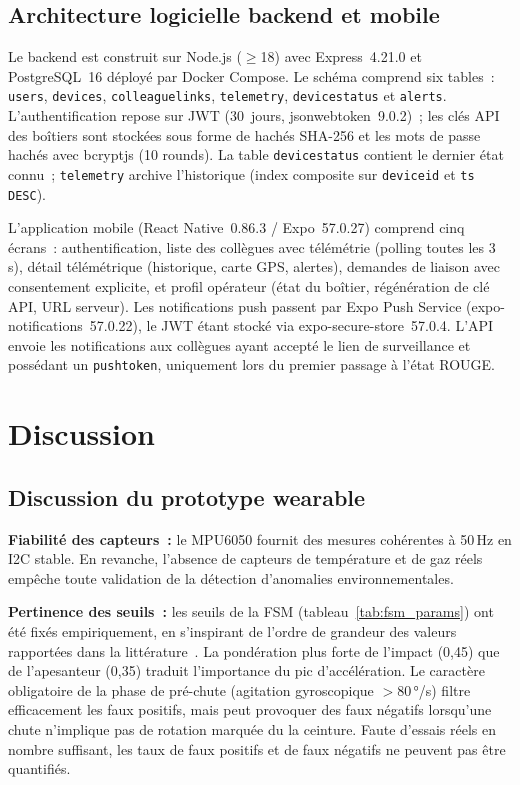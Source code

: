 \documentclass[12pt,a4paper]{article}
\renewcommand{\_}{\textunderscore\allowbreak}
\begin{document}
\subsection{Architecture logicielle backend et mobile}

Le backend est construit sur Node.js ($\geq$18) avec Express~4.21.0 et PostgreSQL~16 déployé par Docker Compose. Le schéma comprend six tables~: \texttt{users}, \texttt{devices}, \texttt{colleague\_links}, \texttt{telemetry}, \texttt{device\_status} et \texttt{alerts}. L'authentification repose sur JWT (30~jours, jsonwebtoken~9.0.2)~; les clés API des boîtiers sont stockées sous forme de hachés SHA-256 et les mots de passe hachés avec bcryptjs (10 rounds). La table \texttt{device\_status} contient le dernier état connu~; \texttt{telemetry} archive l'historique (index composite sur \texttt{device\_id} et \texttt{ts DESC}).

L'application mobile (React Native~0.86.3 / Expo~57.0.27) comprend cinq écrans~: authentification, liste des collègues avec télémétrie (polling toutes les 3\,s), détail télémétrique (historique, carte GPS, alertes), demandes de liaison avec consentement explicite, et profil opérateur (état du boîtier, régénération de clé API, URL serveur). Les notifications push passent par Expo Push Service (expo-notifications~57.0.22), le JWT étant stocké via expo-secure-store~57.0.4. L'API envoie les notifications aux collègues ayant accepté le lien de surveillance et possédant un \texttt{push\_token}, uniquement lors du premier passage à l'état ROUGE.



\section{Discussion}

\subsection{Discussion du prototype wearable}

\textbf{Fiabilité des capteurs~:} le MPU6050 fournit des mesures cohérentes à 50\,Hz en I2C stable. En revanche, l'absence de capteurs de température et de gaz réels empêche toute validation de la détection d'anomalies environnementales.

\textbf{Pertinence des seuils~:} les seuils de la FSM (tableau~\ref{tab:fsm_params}) ont été fixés empiriquement, en s'inspirant de l'ordre de grandeur des valeurs rapportées dans la littérature~\cite{ref_fall_detection_threshold,ref_kangas}. La pondération plus forte de l'impact (0,45) que de l'apesanteur (0,35) traduit l'importance du pic d'accélération. Le caractère obligatoire de la phase de pré-chute (agitation gyroscopique $>80$\,°/s) filtre efficacement les faux positifs, mais peut provoquer des faux négatifs lorsqu'une chute n'implique pas de rotation marquée du la ceinture. Faute d'essais réels en nombre suffisant, les taux de faux positifs et de faux négatifs ne peuvent pas être quantifiés.
\end{document}
